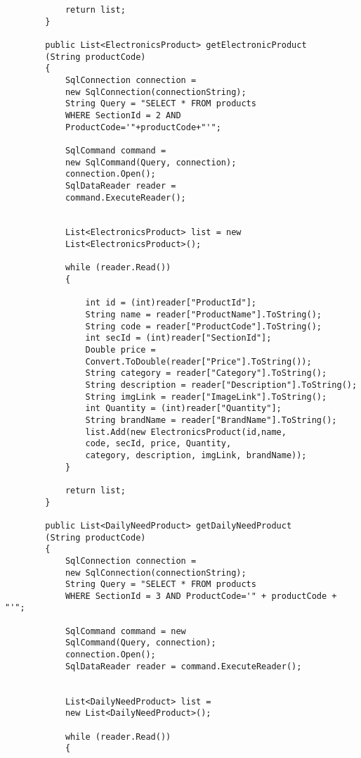 \begin{lstlisting}
            return list;
        }

        public List<ElectronicsProduct> getElectronicProduct
        (String productCode)
        {
            SqlConnection connection = 
            new SqlConnection(connectionString);
            String Query = "SELECT * FROM products 
            WHERE SectionId = 2 AND 
            ProductCode='"+productCode+"'";

            SqlCommand command =
            new SqlCommand(Query, connection);
            connection.Open();
            SqlDataReader reader = 
            command.ExecuteReader();


            List<ElectronicsProduct> list = new 
            List<ElectronicsProduct>();

            while (reader.Read())
            {

                int id = (int)reader["ProductId"];
                String name = reader["ProductName"].ToString();
                String code = reader["ProductCode"].ToString();
                int secId = (int)reader["SectionId"];
                Double price = 
                Convert.ToDouble(reader["Price"].ToString());
                String category = reader["Category"].ToString();
                String description = reader["Description"].ToString();
                String imgLink = reader["ImageLink"].ToString();
                int Quantity = (int)reader["Quantity"];
                String brandName = reader["BrandName"].ToString();
                list.Add(new ElectronicsProduct(id,name, 
                code, secId, price, Quantity, 
                category, description, imgLink, brandName));
            }

            return list;
        }

        public List<DailyNeedProduct> getDailyNeedProduct
        (String productCode)
        {
            SqlConnection connection = 
            new SqlConnection(connectionString);
            String Query = "SELECT * FROM products 
            WHERE SectionId = 3 AND ProductCode='" + productCode + "'";

            SqlCommand command = new
            SqlCommand(Query, connection);
            connection.Open();
            SqlDataReader reader = command.ExecuteReader();


            List<DailyNeedProduct> list =
            new List<DailyNeedProduct>();

            while (reader.Read())
            {


\end{lstlisting}
